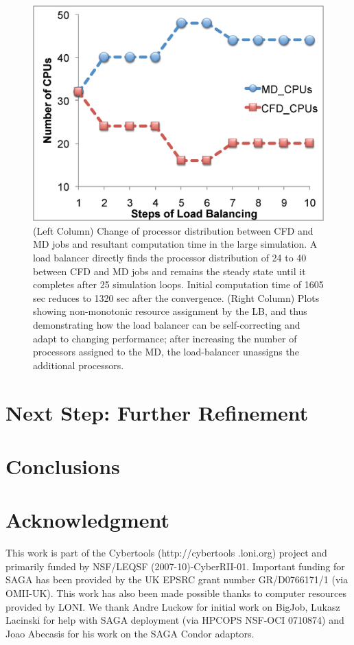 \documentclass[conference,final]{IEEEtran}
\begin{document}
\begin{figure}
\includegraphics[scale=0.31]{fig7_22.eps}
\caption{\small (Left Column) Change of processor distribution between
  CFD and MD jobs and resultant computation time in the large
  simulation. A load balancer directly finds the processor
  distribution of 24 to 40 between CFD and MD jobs and remains the
  steady state until it completes after 25 simulation loops. Initial
  computation time of 1605 sec reduces to 1320 sec after the
  convergence. (Right Column) Plots showing non-monotonic resource
  assignment by the LB, and thus demonstrating how the load balancer
  can be self-correcting and adapt to changing performance; after
  increasing the number of processors assigned to the MD, the
  load-balancer unassigns the additional processors.}
\label{Fig:LBLarge}
\vspace{-1em}
\end{figure}



\section{Next Step: Further Refinement}


\section{Conclusions}



\section*{Acknowledgment}
This work is part of the Cybertools (http://cybertools .loni.org)
project and primarily funded by NSF/LEQSF (2007-10)-CyberRII-01.
Important funding for SAGA has been provided by the UK EPSRC grant
number GR/D0766171/1 (via OMII-UK). This work has also been made
possible thanks to computer resources provided by LONI. We thank Andre
Luckow for initial work on BigJob, Lukasz Lacinski for help with SAGA
deployment (via HPCOPS NSF-OCI 0710874) and Joao Abecasis for his work
on the SAGA Condor adaptors.

\nocite{ex1,ex2}


\end{document}
